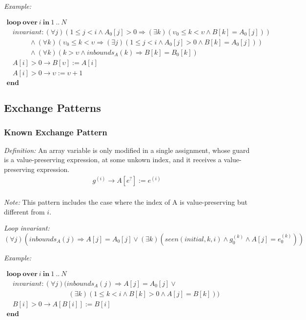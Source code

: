 \documentclass[a4paper,10pt]{article}
\newcommand{\idx}{\ensuremath{i}\xspace}
\newcommand{\idxinitial}{\ensuremath{\mathit{initial}}\xspace}
\newcommand{\KWloop}{\ensuremath{\mathrm{\textbf{loop}}~}}
\newcommand{\KWend}{\ensuremath{\mathrm{\textbf{end}}~}}
\newcommand{\KWover}{\ensuremath{\mathrm{\textbf{over}}~}}
\newcommand{\KWin}{\ensuremath{~\mathrm{\textbf{in}}~}}
\newcommand{\at}[1]{{(#1)}}
\newcommand{\impl}{\ensuremath{\Longrightarrow}}
\newcommand{\inbounds}[2]{\ensuremath{\mathit{inbounds}_{#1}(#2)}\xspace}
\newcommand{\seen}[3]{\ensuremath{\mathit{seen}{(#1,#2,#3)}}\xspace}
\newcommand{\loopinvariant}{\noindent\textit{Loop invariant:}\xspace}
\newcommand{\patterndef}{\noindent\textit{Definition:}\xspace}
\newcommand{\patternexample}{\noindent\textit{Example:}\xspace}
\newcommand{\patternnote}{\noindent\textit{Note:}\xspace}
\begin{document}
\bigskip
\patternexample

\medskip
$\begin{array}{l}
  \KWloop \KWover i \KWin 1~..~N \\
  ~~~~ \textit{invariant}: (\forall j)(1 \leq j < i \land A_0[j] > 0 \impl (\exists k)(\upsilon_0 \leq k < \upsilon \land B[k] = A_0[j]))\\
  ~~~~~~~~~~~~~~~ \land (\forall k)(\upsilon_0 \leq k < \upsilon \impl (\exists j)(1 \leq j < i \land  A_0[j] > 0 \land B[k] = A_0[j]))\\
  ~~~~~~~~~~~~~~~ \land (\forall k)(k > \upsilon \land \inbounds{A}{k} \impl B[k] = B_0[k])\\
  ~~~~ A[i] > 0 \rightarrow B[\upsilon] := A[i]\\
  ~~~~ A[i] > 0 \rightarrow \upsilon := \upsilon + 1\\
  \KWend
\end{array}$

\subsection{Exchange Patterns}

\subsubsection*{Known Exchange Pattern}

\patterndef An array variable is only modified in a single assignment,
whose guard is a value-preserving expression, at some unkown index, 
and it receives a value-preserving expression.
%
\begin{eqnarray*}
g^\at{\idx} \rightarrow A[e^?] := e^\at{\idx}\\
\end{eqnarray*}

%
\patternnote This pattern includes the case where the index of A is value-preserving but different from $i$.

\medskip
%
\loopinvariant
%
$$(\forall j)(\inbounds{A}{j} \impl A[j] = A_0[j] \lor (\exists k)(\seen{\idxinitial}{k}{\idx} \land g_0^\at{k} \land A[j] = e_0^\at{k}))$$

\bigskip
\patternexample

\medskip
$\begin{array}{l}
  \KWloop \KWover i \KWin 1~..~N \\
  ~~~~ \textit{invariant}: (\forall j)(\inbounds{A}{j} \impl A[j] = A_0[j] \lor \\ 
  ~~~~~~~~~~~~~~~~~~~~~~~~~~~~~~~~~~~~~~~~~ (\exists k)(1 \leq k < i \land B[k] > 0 \land A[j] = B[k]))\\
  ~~~~ B[i] > 0 \rightarrow A[B[i]] := B[i]\\
  \KWend
\end{array}$
\end{document}
